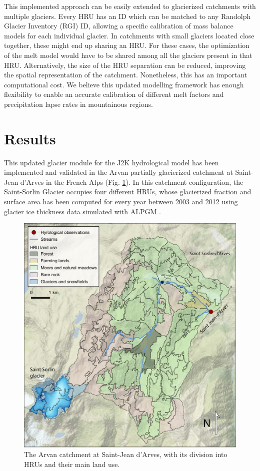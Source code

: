 This implemented approach can be easily extended to glacierized catchments with multiple glaciers. Every HRU has an ID which can be matched to any Randolph Glacier Inventory (RGI) ID, allowing a specific calibration of mass balance models for each individual glacier. In catchments with small glaciers located close together, these might end up sharing an HRU. For these cases, the optimization of the melt model would have to be shared among all the glaciers present in that HRU. Alternatively, the size of the HRU separation can be reduced, improving the spatial representation of the catchment. Nonetheless, this has an important computational cost. We believe this updated modelling framework has enough flexibility to enable an accurate calibration of different melt factors and precipitation lapse rates in mountainous regions. 

\section{Results}

This updated glacier module for the J2K hydrological model has been implemented and validated in the Arvan partially glacierized catchment at Saint-Jean d'Arves in the French Alps (Fig. \ref{hydro:fig2}). In this catchment configuration, the Saint-Sorlin Glacier occupies four different HRUs, whose glacierized fraction and surface area has been computed for every year between 2003 and 2012 using glacier ice thickness data simulated with ALPGM \citep{bolibar_alpgm_2020}.

\begin{figure}[h]
\centering
\includegraphics[width=12cm]{Figures/hydro/Figure_2.pdf}
\caption{The Arvan catchment at Saint-Jean d'Arves, with its division into HRUs and their main land use. } 
\label{hydro:fig2}
\end{figure}

